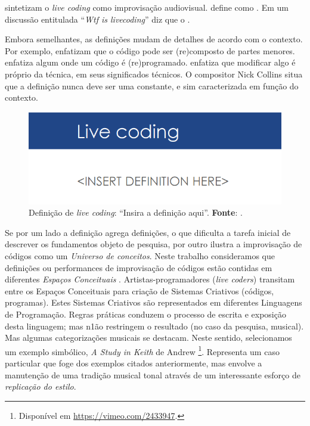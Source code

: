  sintetizam o \emph{live coding} como improvisação audiovisual.  define como . Em um discussão entitulada ``\emph{Wtf is livecoding}'' diz que o  .

Embora semelhantes, as definições mudam de detalhes de acordo com o contexto. Por exemplo,  enfatizam que o código pode ser (re)composto de partes menores.  enfatiza algum onde um código é (re)programado.  enfatiza que modificar algo é próprio da técnica, em seus significados técnicos. O compositor Nick Collins situa que a definição nunca deve ser uma constante, e sim caracterizada em função do contexto. 

  \begin{figure}[h]
    \centering
    \includegraphics[scale=0.7]{imagens/live_coding_def.png}
    \caption{Definição de \emph{live coding}: ``Insira a definição aqui''. \textbf{Fonte}: .}
    \label{fig:live_coding_def}
  \end{figure}


Se por um lado a definição agrega definições, o que dificulta a tarefa inicial de descrever os fundamentos objeto de pesquisa, por outro ilustra a improvisação de códigos como um \emph{Universo de conceitos}. Neste trabalho consideramos que definições ou performances de improvisação de códigos estão contidas em diferentes \emph{Espaços Conceituais} \cite{wiggins_framework_2006,mclean_music_2006}. Artistas-programadores (\emph{live coders}) transitam entre os Espaços Conceituais para criação de Sistemas Criativos (códigos, programas). Estes Sistemas Criativos são representados em diferentes Linguagens de Programação. Regras práticas conduzem o processo de escrita e exposição desta linguagem; mas n1ão restringem o resultado (no caso da pesquisa, musical). Mas algumas categorizações musicais se destacam.  Neste sentido, selecionamos um exemplo simbólico, \emph{A Study in Keith} de Andrew \footnote{Disponível em \url{https://vimeo.com/2433947}.}. Representa um caso particular que foge dos exemplos citados anteriormente, mas envolve a manutenção de uma tradição musical tonal através de um interessante esforço de \emph{replicação do estilo}. 




